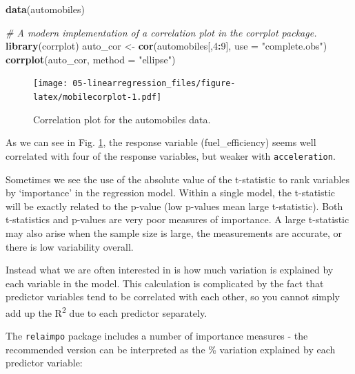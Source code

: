 \documentclass[]{book}
\newenvironment{Shaded}{\begin{snugshade}}{\end{snugshade}}
\newcommand{\CommentTok}[1]{\textcolor[rgb]{0.56,0.35,0.01}{\textit{#1}}}
\newcommand{\DataTypeTok}[1]{\textcolor[rgb]{0.13,0.29,0.53}{#1}}
\newcommand{\DecValTok}[1]{\textcolor[rgb]{0.00,0.00,0.81}{#1}}
\newcommand{\KeywordTok}[1]{\textcolor[rgb]{0.13,0.29,0.53}{\textbf{#1}}}
\newcommand{\NormalTok}[1]{#1}
\newcommand{\OperatorTok}[1]{\textcolor[rgb]{0.81,0.36,0.00}{\textbf{#1}}}
\newcommand{\StringTok}[1]{\textcolor[rgb]{0.31,0.60,0.02}{#1}}
\begin{document}
\begin{Shaded}
\begin{Highlighting}[]
\KeywordTok{data}\NormalTok{(automobiles)}

\CommentTok{# A modern implementation of a correlation plot in the corrplot package.}
\KeywordTok{library}\NormalTok{(corrplot)}
\NormalTok{auto_cor <-}\StringTok{ }\KeywordTok{cor}\NormalTok{(automobiles[,}\DecValTok{4}\OperatorTok{:}\DecValTok{9}\NormalTok{], }\DataTypeTok{use =} \StringTok{"complete.obs"}\NormalTok{)}
\KeywordTok{corrplot}\NormalTok{(auto_cor, }\DataTypeTok{method =} \StringTok{"ellipse"}\NormalTok{)}
\end{Highlighting}
\end{Shaded}

\begin{figure}
\centering
\texttt{[image: 05-linearregression\_files/figure-latex/mobilecorplot-1.pdf]}
\caption{\label{fig:mobilecorplot}Correlation plot for the automobiles data.}
\end{figure}

As we can see in Fig. \ref{fig:mobilecorplot}, the response variable (fuel\_efficiency) seems well correlated with four of the response variables, but weaker with \texttt{acceleration}.

Sometimes we see the use of the absolute value of the t-statistic to rank variables by `importance' in the regression model. Within a single model, the t-statistic will be exactly related to the p-value (low p-values mean large t-statistic). Both t-statistics and p-values are very poor measures of importance. A large t-statistic may also arise when the sample size is large, the measurements are accurate, or there is low variability overall.

Instead what we are often interested in is how much variation is explained by each variable in the model. This calculation is complicated by the fact that predictor variables tend to be correlated with each other, so you cannot simply add up the R\textsuperscript{2} due to each predictor separately.

The \texttt{relaimpo} package includes a number of importance measures - the recommended version can be interpreted as the \% variation explained by each predictor variable:
\end{document}
